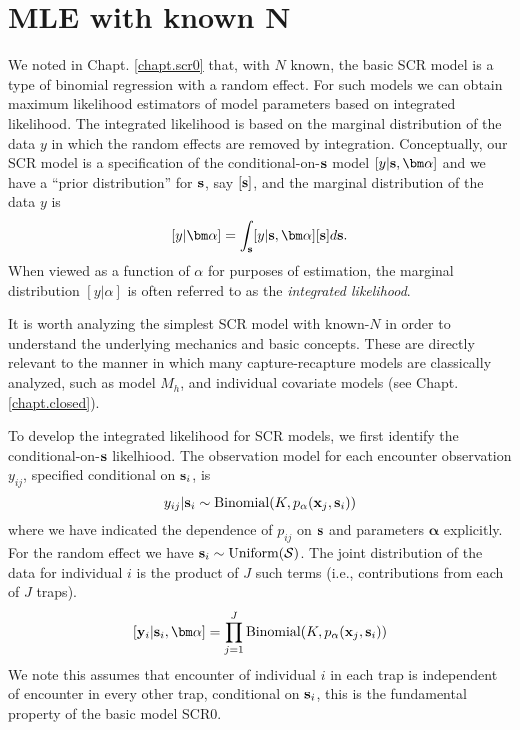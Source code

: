 \section{MLE with known N}

We noted in Chapt. \ref{chapt.scr0} that, with $N$ known, the basic SCR model is a
type of binomial regression with a random effect. For such models we
can  obtain maximum likelihood estimators of model parameters
based on integrated likelihood. The integrated likelihood is based on
the marginal distribution of the data $y$ in which the random effects
are removed by integration. Conceptually, our SCR model is a specification
of the conditional-on-${\bf s}$ model $[y|{\bf s},{\bm \alpha}]$ and we have
a ``prior distribution'' for ${\bf s}$, say $[{\bf s}]$, and the
marginal distribution of the data $y$ is
\[
[y|{\bm \alpha}] =  \int_{\bf s} [y|{\bf s},{\bm \alpha}][{\bf s}] d{\bf s}.
\]
When viewed as a function of $\alpha$ for purposes of estimation, the
marginal distribution $[y|\alpha]$ is often referred to as the {\it
  integrated likelihood}.

It is worth analyzing 
the simplest SCR model with known-$N$ in order to understand the
underlying mechanics and basic concepts. These are directly relevant to
the manner in which many capture-recapture models are classically
analyzed, such as model $M_h$, and individual covariate models (see
Chapt. \ref{chapt.closed}).

 To develop the integrated
likelihood for SCR models, we first identify the conditional-on-${\bf s}$
likelhiood. 
The observation model for each encounter observation $y_{ij}$,
specified conditional on ${\bf s}_{i}$, is 
\begin{equation}
y_{ij}| {\bf s}_{i} \sim \mbox{Binomial}(K, p_{\alpha}({\bf x}_{j},{\bf s}_{i}))
\label{mle.eq.cond-on-s}
\end{equation}
where we have indicated the dependence of $p_{ij}$ on ${\bf s}$ and
parameters ${\bm \alpha}$
explicitly.
For the random effect we have ${\bf s}_{i} \sim  \mbox{Uniform}({\cal
  S})$.
The joint distribution of the data for individual $i$ is the product
of $J$ such terms (i.e., contributions from each of $J$ traps).
\[
  [{\bf y}_{i} | {\bf s}_{i} , {\bm \alpha}] = 
  \prod_{j=1}^{J} \mbox{Binomial}(K, p_{\alpha}({\bf x}_{j},{\bf s}_{i}) )
\]
We note this assumes that encounter of individual $i$ in each
trap is independent of encounter in every other trap, conditional on
${\bf s}_{i}$, this is the fundamental property of the basic model SCR0.


